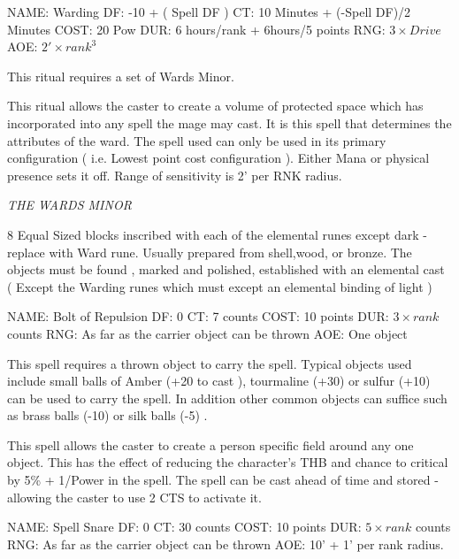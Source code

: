 \newpage

\spell
NAME: Warding
DF:  -10 + ( Spell DF )
CT:  10 Minutes + (-Spell DF)/2 Minutes
COST:  20 Pow
DUR:  6 hours/rank + 6hours/5 points
RNG:  \( 3 \times Drive \)
AOE:  \( 2' \times rank ^3 \)



This ritual requires a set of Wards Minor.


This ritual allows the caster to create a volume of protected
space which has incorporated into any spell the mage may cast. It is
this spell that determines the attributes of the ward. The spell used
can only be used in its primary configuration ( i.e. Lowest point
cost configuration ). Either Mana or physical presence sets it off.
Range of sensitivity is 2' per RNK radius.

{\it THE WARDS MINOR}

8 Equal Sized blocks inscribed with each of the elemental
runes except dark - replace with Ward rune. Usually prepared from
shell,wood, or bronze. The objects must be found , marked and
polished, established with an elemental cast ( Except the Warding
runes which must except an elemental binding of light )

\newpage

\spell
NAME: Bolt of Repulsion
DF:  0
CT:  7 counts
COST:  10 points
DUR:  \( 3 \times rank \) counts
RNG:  As far as the carrier object can be thrown
AOE:  One object

\bigskip


This spell requires a thrown object to carry the spell. Typical
objects used include small balls of Amber (+20 to cast ), tourmaline (+30)
or sulfur (+10) can be used to carry the spell. In addition other common
objects can suffice such as brass balls (-10) or silk balls (-5) .


This spell allows the caster to create a person specific field
around any one object. This has the effect of reducing the character's
THB and chance to critical by 5\% + 1/Power in the spell. The spell can
be cast ahead of time and stored - allowing the caster to use 2 CTS to
activate it.

\newpage

\spell
NAME: Spell Snare
DF:  0
CT:  30 counts
COST:  10 points
DUR:  \( 5 \times rank \) counts
RNG:  As far as the carrier object can be thrown
AOE:  10' + 1' per rank radius.

